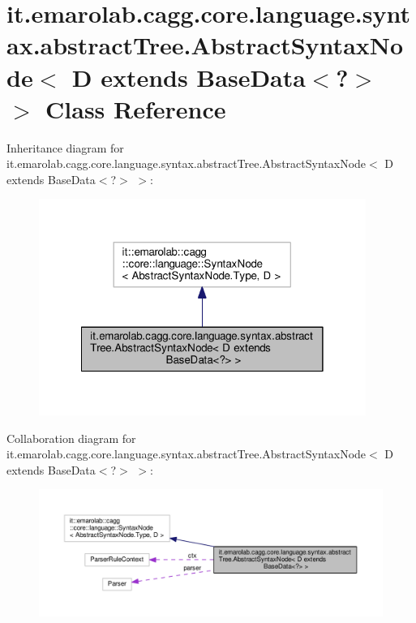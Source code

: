 \hypertarget{classit_1_1emarolab_1_1cagg_1_1core_1_1language_1_1syntax_1_1abstractTree_1_1AbstractSyntaxNode_366ce7377666ed8848a32408270165e9}{\section{it.\-emarolab.\-cagg.\-core.\-language.\-syntax.\-abstract\-Tree.\-Abstract\-Syntax\-Node$<$ D extends Base\-Data$<$?$>$ $>$ Class Reference}
\label{classit_1_1emarolab_1_1cagg_1_1core_1_1language_1_1syntax_1_1abstractTree_1_1AbstractSyntaxNode_366ce7377666ed8848a32408270165e9}
}


Inheritance diagram for it.\-emarolab.\-cagg.\-core.\-language.\-syntax.\-abstract\-Tree.\-Abstract\-Syntax\-Node$<$ D extends Base\-Data$<$?$>$ $>$\-:\nopagebreak
\begin{figure}[H]
\begin{center}
\leavevmode
\includegraphics[width=302pt]{classit_1_1emarolab_1_1cagg_1_1core_1_1language_1_1syntax_1_1abstractTree_1_1AbstractSyntaxNode_b08312429fb31759d916298ee30c3da2}
\end{center}
\end{figure}


Collaboration diagram for it.\-emarolab.\-cagg.\-core.\-language.\-syntax.\-abstract\-Tree.\-Abstract\-Syntax\-Node$<$ D extends Base\-Data$<$?$>$ $>$\-:\nopagebreak
\begin{figure}[H]
\begin{center}
\leavevmode
\includegraphics[width=350pt]{classit_1_1emarolab_1_1cagg_1_1core_1_1language_1_1syntax_1_1abstractTree_1_1AbstractSyntaxNode_dd62d32846657e9c83fc09e3e4bab09d}
\end{center}
\end{figure}
